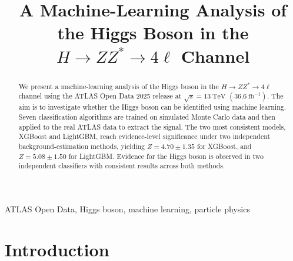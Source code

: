 \documentclass[conference]{IEEEtran}
\begin{document}

\title{A Machine-Learning Analysis of the Higgs Boson in the $H \rightarrow ZZ^{*} \rightarrow 4\ell$ Channel\\}

\author{
\and
{}
}
\maketitle

\begin{abstract}
We present a machine-learning analysis of the Higgs boson in the $H \rightarrow ZZ^{*} \rightarrow 4\ell$ channel using the ATLAS Open Data 2025 release at $\sqrt{s} = 13~\mathrm{TeV}$ $(36.6~\mathrm{fb}^{-1})$. The aim is to investigate whether the Higgs boson can be identified using machine learning. Seven classification algorithms are trained on simulated Monte Carlo data and then applied to the real ATLAS data to extract the signal. The two most consistent models, XGBoost and LightGBM, reach evidence-level significance under two independent background-estimation methods, yielding $Z = 4.70 \pm 1.35$ for XGBoost, and $Z = 5.08 \pm 1.50$ for LightGBM. Evidence for the Higgs boson is observed in two independent classifiers with consistent results across both methods.
\end{abstract}

\begin{IEEEkeywords}
ATLAS Open Data, Higgs boson, machine learning, particle physics
\end{IEEEkeywords}

\section*{Introduction}
\end{document}
